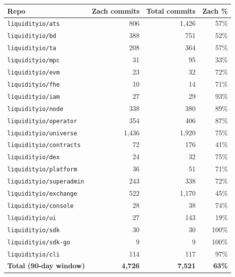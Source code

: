 \documentclass[11pt,letterpaper]{article}
\begin{document}
\begin{center}
\begin{small}
\begin{tabular}{lrrr}
\toprule
\textbf{Repo} & \textbf{Zach commits} & \textbf{Total commits} & \textbf{Zach \%} \\
\midrule
\texttt{liquidityio/ats}        & 806    & 1{,}426 & 57\% \\
\texttt{liquidityio/bd}         & 388    & 751     & 52\% \\
\texttt{liquidityio/ta}         & 208    & 364     & 57\% \\
\texttt{liquidityio/mpc}        & 31     & 95      & 33\% \\
\texttt{liquidityio/evm}        & 23     & 32      & 72\% \\
\texttt{liquidityio/fhe}        & 10     & 14      & 71\% \\
\texttt{liquidityio/iam}        & 27     & 29      & 93\% \\
\texttt{liquidityio/node}       & 338    & 380     & 89\% \\
\texttt{liquidityio/operator}   & 354    & 406     & 87\% \\
\texttt{liquidityio/universe}   & 1{,}436 & 1{,}920 & 75\% \\
\texttt{liquidityio/contracts}  & 72     & 176     & 41\% \\
\texttt{liquidityio/dex}        & 24     & 32      & 75\% \\
\texttt{liquidityio/platform}   & 36     & 51      & 71\% \\
\texttt{liquidityio/superadmin} & 243    & 338     & 72\% \\
\texttt{liquidityio/exchange}   & 522    & 1{,}170 & 45\% \\
\texttt{liquidityio/console}    & 28     & 38      & 74\% \\
\texttt{liquidityio/ui}         & 27     & 143     & 19\% \\
\texttt{liquidityio/sdk}        & 30     & 30      & 100\% \\
\texttt{liquidityio/sdk-go}     & 9      & 9       & 100\% \\
\texttt{liquidityio/cli}        & 114    & 117     & 97\% \\
\midrule
\textbf{Total (90-day window)} & \textbf{4{,}726} & \textbf{7{,}521} & \textbf{63\%} \\
\bottomrule
\end{tabular}
\end{small}
\end{center}
\end{document}
